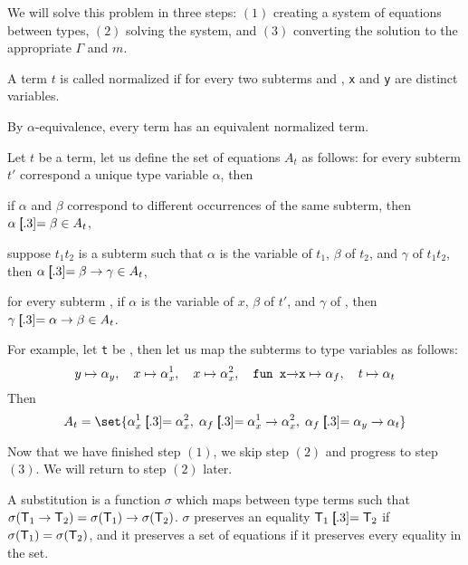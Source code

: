 \edefn

We will solve this problem in three steps: $(1)$ creating a system of equations between types, $(2)$ solving the system, and $(3)$ converting the solution to the appropriate $\Gamma$ and $m$.

\bdefn

    A term $t$ is called {\emphcolor normalized} if for every two subterms  and , {\tt x} and {\tt y} are distinct variables.

\edefn

By $\alpha$-equivalence, every term has an equivalent normalized term.

\bdefn

    Let $t$ be a term, let us define the set of equations $A_t$ as follows: for every subterm $t'$ correspond a unique type variable $\alpha$, then
    \benum
        \item if $\alpha$ and $\beta$ correspond to different occurrences of the same subterm, then $\alpha\eq\beta\in A_t$,
        \item suppose $t_1t_2$ is a subterm such that $\alpha$ is the variable of $t_1$, $\beta$ of $t_2$, and $\gamma$ of $t_1t_2$, then $\alpha\eq\beta\to\gamma\in A_t$,
        \item for every subterm , if $\alpha$ is the variable of $x$, $\beta$ of $t'$, and $\gamma$ of , then $\gamma\eq\alpha\to\beta\in A_t$.
    \eenum

\edefn

For example, let {\tt t} be , then let us map the subterms to type variables as follows:
$$ y\mapsto\alpha_y,\quad x\mapsto\alpha_x^1,\quad x\mapsto\alpha_x^2,\quad \lcalc{fun x\to x}\mapsto\alpha_f,\quad t\mapsto\alpha_t $$
Then
$$ A_t = \set{\alpha_x^1\eq\alpha_x^2,\;\alpha_f\eq\alpha^1_x\to\alpha^2_x,\;\alpha_f\eq\alpha_y\to\alpha_t} $$

Now that we have finished step $(1)$, we skip step $(2)$ and progress to step $(3)$.
We will return to step $(2)$ later.

\bdefn

    A {\emphcolor substitution} is a function $\sigma$ which maps between type terms such that $\sigma(\T_1\to\T_2)=\sigma(\T_1)\to\sigma(\T_2)$.
    $\sigma$ {\emphcolor preserves} an equality $\T_1\eq\T_2$ if $\sigma({\sf T}_1)=\sigma({\sf T}_2)$, and it preserves a set of equations if it preserves every equality in the set.

